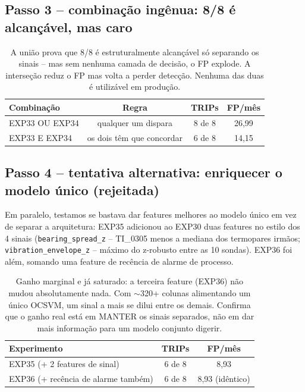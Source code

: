 \documentclass[11pt,a4paper]{article}
\begin{document}
\subsection{Passo 3 -- combinação ingênua: 8/8 é alcançável, mas caro}

\begin{table}[H]
\centering
\begin{tabular}{lccc}
\toprule
\textbf{Combinação} & \textbf{Regra} & \textbf{TRIPs} & \textbf{FP/mês} \\
\midrule
EXP33 OU EXP34 & qualquer um dispara & 8 de 8 & 26,99 \\
EXP33 E EXP34 & os dois têm que concordar & 6 de 8 & 14,15 \\
\bottomrule
\end{tabular}
\caption{A união prova que 8/8 é estruturalmente alcançável só
separando os sinais -- mas sem nenhuma camada de decisão, o FP
explode. A interseção reduz o FP mas volta a perder detecção. Nenhuma
das duas é utilizável em produção.}
\end{table}

\subsection{Passo 4 -- tentativa alternativa: enriquecer o modelo único (rejeitada)}

Em paralelo, testamos se bastava dar features melhores ao modelo
único em vez de separar a arquitetura: EXP35 adicionou ao EXP30 duas
features no estilo dos 4 sinais (\texttt{bearing\_spread\_z} -- TI\_0305
menos a mediana dos termopares irmãos; \texttt{vibration\_envelope\_z}
-- máximo do z-robusto entre as 10 sondas). EXP36 foi além, somando
uma feature de recência de alarme de processo.

\begin{table}[H]
\centering
\begin{tabular}{lcc}
\toprule
\textbf{Experimento} & \textbf{TRIPs} & \textbf{FP/mês} \\
\midrule
EXP35 (+ 2 features de sinal) & 6 de 8 & 8,93 \\
EXP36 (+ recência de alarme também) & 6 de 8 & 8,93 (idêntico) \\
\bottomrule
\end{tabular}
\caption{Ganho marginal e já saturado: a terceira feature (EXP36) não
mudou absolutamente nada. Com $\sim$320+ colunas alimentando um único
OCSVM, um sinal a mais se dilui entre os demais. Confirma que o ganho
real está em MANTER os sinais separados, não em dar mais informação
para um modelo conjunto digerir.}
\end{table}
\end{document}
